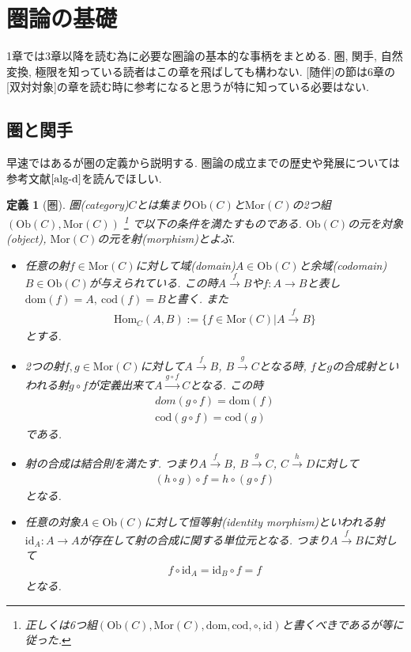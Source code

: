 \documentclass[a4paper,12pt]{ltjsarticle}
\theoremstyle{break}
\newtheorem{defn}[thm]{定義}
\newcommand{\Ob}{\mathrm{Ob}}
\newcommand{\Mor}{\mathrm{Mor}}
\newcommand{\Hom}{\mathrm{Hom}}
\newcommand{\xr}[1]{\xrightarrow{#1}}
\newcommand{\dom}{\mathrm{dom}}
\newcommand{\cod}{\mathrm{cod}}
\newcommand{\id}{\mathrm{id}}
\numberwithin{equation}{section}
\begin{document}
\newpage

\tableofcontents

\newpage

\section{圏論の基礎}

1章では3章以降を読む為に必要な圏論の基本的な事柄をまとめる. 
圏, 関手, 自然変換, 極限を知っている読者はこの章を飛ばしても構わない. 
[随伴]の節は6章の[双対対象]の章を読む時に参考になると思うが特に知っている必要はない. 

\subsection{圏と関手}

早速ではあるが圏の定義から説明する. 
圏論の成立までの歴史や発展については参考文献$\cite{alg-d}$を読んでほしい.

\begin{defn}[圏]
  圏(category)$C$とは集まり$\Ob(C)$と$\Mor(C)$の2つ組$(\Ob(C),\Mor(C))$
  \footnote{
    正しくは6つ組$(\Ob(C),\Mor(C),\dom,\cod,\circ,\id)$と書くべきであるが\cite{alg-d}等に従った. 
  }
  で以下の条件を満たすものである. 
  $\Ob(C)$の元を対象(object), $\Mor(C)$の元を射(morphism)とよぶ. 
  \begin{itemize}
    \item 任意の射$f \in \Mor(C)$に対して域(domain)$A \in \Ob(C)$と余域(codomain)$B \in \Ob(C)$が与えられている. 
    この時$A \xr{f} B$や$f: A \to B$と表し$\dom(f)=A, ~\cod(f)=B$と書く. 
    また
    \begin{align*}
      \Hom_C(A,B) := \{f \in \Mor(C) | A \xr{f} B \}
    \end{align*}
    とする. 
    \item 2つの射$f, g \in \Mor(C)$に対して$A \xr{f} B$, $B \xr{g} C$となる時, $f$と$g$の合成射といわれる射$g \circ f$が定義出来て$A \xr{g \circ f} C$となる. 
    この時
    \begin{align*}
      dom(g \circ f)=\dom(f) \\
      \cod(g \circ f)=\cod(g)
    \end{align*}
    である. 
    \item 射の合成は結合則を満たす. 
    つまり$A \xr{f} B$, $B \xr{g} C$, $C \xr{h} D$に対して
    \begin{align*}
      (h \circ g) \circ f = h \circ (g \circ f)
    \end{align*}
    となる. 
    \item 任意の対象$A \in \Ob(C)$に対して恒等射(identity morphism)といわれる射$\id_A: A \to A$が存在して射の合成に関する単位元となる. 
    つまり$A \xr{f} B$に対して
    \begin{align*}
      f \circ \id_A = \id_B \circ f = f
    \end{align*}
    となる. 
  \end{itemize}
\end{defn}
\end{document}
